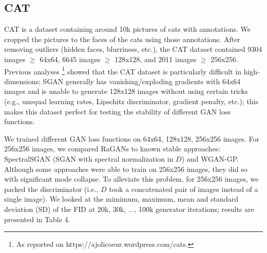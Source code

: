 \documentclass{article}
\begin{document}
\subsection{CAT}

CAT is a dataset containing around 10k pictures of cats with annotations. We cropped the pictures to the faces of the cats using those annotations. After removing outliers (hidden faces, blurriness, etc.), the CAT dataset contained 9304 images $\ge$ 64x64, 6645 images $\ge$ 128x128, and 2011 images $\ge$ 256x256. Previous analyses \footnote{As reported on https://ajolicoeur.wordpress.com/cats.} showed that the CAT dataset is particularly difficult in high-dimensions; SGAN generally has vanishing/exploding gradients with 64x64 images and is unable to generate 128x128 images without using certain tricks (e.g., unequal learning rates, Lipschitz discriminator, gradient penalty, etc.); this makes this dataset perfect for testing the stability of different GAN loss functions. 

We trained different GAN loss functions on 64x64, 128x128, 256x256 images. For 256x256 images, we compared RaGANs to known stable approaches: SpectralSGAN (SGAN with spectral normalization in $D$) and WGAN-GP. Although some approaches were able to train on 256x256 images, they did so with significant mode collapse. To alleviate this problem, for 256x256 images, we packed the discriminator \citep{pacgan} (i.e., $D$ took a concatenated pair of images instead of a single image). We looked at the mimimum, maximum, mean and standard deviation (SD) of the FID at 20k, 30k, ..., 100k generator iterations; results are presented in Table 4.
\end{document}
